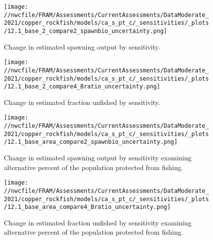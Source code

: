 \documentclass[11pt,
  english,
  a4paper,
]{article}
\begin{document}
\begin{figure}
\centering
\texttt{[image: //nwcfile/FRAM/Assessments/CurrentAssessments/DataModerate\_2021/copper\_rockfish/models/ca\_s\_pt\_c/\_sensitivities/\_plots/12.1\_base\_2\_compare2\_spawnbio\_uncertainty.png]}
\caption{Change in estimated spawning output by sensitivity.\label{fig:sens-ssb-2}}
\end{figure}

\tagmcend\tagstructend


\begin{figure}
\centering
\texttt{[image: //nwcfile/FRAM/Assessments/CurrentAssessments/DataModerate\_2021/copper\_rockfish/models/ca\_s\_pt\_c/\_sensitivities/\_plots/12.1\_base\_2\_compare4\_Bratio\_uncertainty.png]}
\caption{Change in estimated fraction unfished by sensitivity.\label{fig:sens-depl-2}}
\end{figure}

\tagmcend\tagstructend

\newpage


\begin{figure}
\centering
\texttt{[image: //nwcfile/FRAM/Assessments/CurrentAssessments/DataModerate\_2021/copper\_rockfish/models/ca\_s\_pt\_c/\_sensitivities/\_plots/12.1\_base\_area\_compare2\_spawnbio\_uncertainty.png]}
\caption{Change in estimated spawning output by sensitivity examining alternative percent of the population protected from fishing.\label{fig:sens-area-ssb}}
\end{figure}

\tagmcend\tagstructend


\begin{figure}
\centering
\texttt{[image: //nwcfile/FRAM/Assessments/CurrentAssessments/DataModerate\_2021/copper\_rockfish/models/ca\_s\_pt\_c/\_sensitivities/\_plots/12.1\_base\_area\_compare4\_Bratio\_uncertainty.png]}
\caption{Change in estimated fraction unfished by sensitivity examining alternative percent of the population protected from fishing.\label{fig:sens-area-depl}}
\end{figure}
\end{document}
